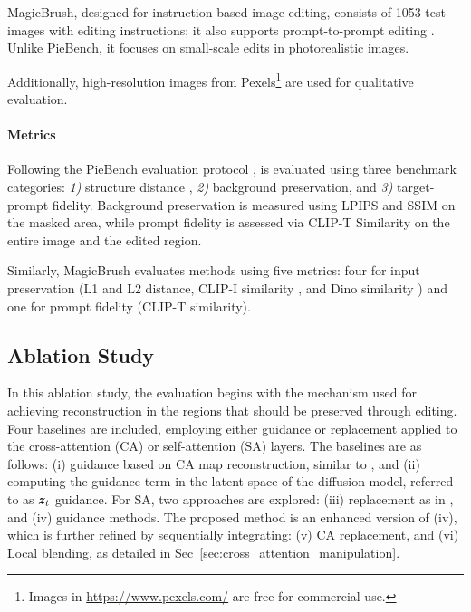 MagicBrush, designed for instruction-based image editing, consists of 1053 test images with editing instructions; it also supports prompt-to-prompt editing \cite{hertz2023prompt}. Unlike PieBench, it focuses on small-scale edits in photorealistic images.  

Additionally, {\modified{}high-resolution images from Pexels}\footnote{Images in \url{https://www.pexels.com/} are free for commercial use.} {\modified{}are used} for qualitative evaluation.


\paragraph{Metrics} Following {\modified{}the} PieBench evaluation protocol \cite{ju2023direct}, {\modified{}\method{} is evaluated} using three benchmark categories: \textit{1)} structure distance \cite{tumanyan2022splicing}, \textit{2)} background preservation, and \textit{3)} target-prompt fidelity. Background preservation is measured using LPIPS \cite{zhang2018perceptual} and SSIM \cite{wang2004ssim} on the masked area, while prompt fidelity is assessed via CLIP-T Similarity \cite{we2021clipsim} on the entire image and the edited region.  

Similarly, MagicBrush evaluates methods using five metrics: four for input preservation (L1 and L2 distance, CLIP-I similarity \cite{Zhang2023MagicBrush}, and Dino similarity \cite{caron2021emerging}) and one for prompt fidelity (CLIP-T similarity).


\subsection{Ablation Study}
\label{sec:expablation}




In this ablation study, {\modified{}the evaluation begins} with the mechanism used for achieving reconstruction in the regions that should be preserved through editing. {\modified{}Four baselines are included}, employing either guidance or replacement applied to the cross-attention (CA) or self-attention (SA) layers. The baselines are as follows: (i) guidance based on CA map reconstruction, similar to \cite{parmar2023zero}, and (ii) computing the guidance term in the latent space of the diffusion model, referred to as ${\bm{z}}_t$ guidance. For SA, {\modified{}two approaches are explored}: (iii) replacement as in \cite{hertz2023prompt,mokady2023null}, and (iv) guidance methods. The proposed method is an enhanced version of (iv), which {\modified{}is further refined} by sequentially integrating: (v) CA replacement, and (vi) Local blending, as detailed in Sec~\ref{sec:cross_attention_manipulation}.


